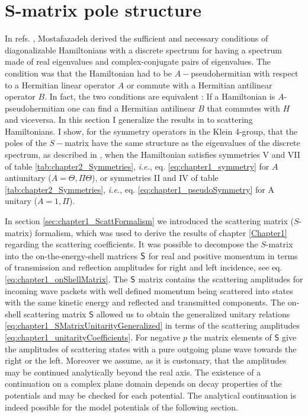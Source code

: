 \section{S-matrix pole structure}
\label{sec:chapter2_SPoles}
%
In refs. \cite{Mostafazadeh2002,Mostafazadeh2002a,Mostafazadeh2002b}, Mostafazadeh derived the sufficient and necessary conditions of diagonalizable Hamiltonians with a discrete spectrum for having a spectrum made of real eigenvalues and complex-conjugate pairs of eigenvalues. The condition was that the Hamiltonian had to be $A-$pseudohermitian with respect to a Hermitian linear operator $A$ or commute with a Hermitian antilinear operator $B$. In fact, the two conditions are equivalent \cite{Mostafazadeh2002b}: If a Hamiltonian is $A$-pseudohermitian one can find a Hermitian antilinear $B$ that commutes with $H$ and viceversa. In this section I generalize the results in \cite{Mostafazadeh2002,Mostafazadeh2002a,Mostafazadeh2002b} to scattering Hamiltonians. I show, for the symmetry operators in the Klein 4-group, that the poles of the $S-$matrix have the same structure as the eigenvalues of the discrete spectrum, as described in \cite{Mostafazadeh2002,Mostafazadeh2002a,Mostafazadeh2002b}, when the Hamiltonian satisfies symmetries V and VII of table \ref{tab:chapter2_Symmetries}, \textit{i.e.}, eq. \eqref{eq:chapter1_symmetry} for $A$ antiunitary ($A = \Theta,\Pi\Theta$), or symmetries II and IV of table \ref{tab:chapter2_Symmetries}, \textit{i.e.}, eq. \eqref{eq:chapter1_pseudoSymmetry} for A unitary ($A = 1,\Pi$).


In section \ref{sec:chapter1_ScattFormalism} we introduced the scattering matrix ($S$-matrix) formalism, which was used to derive the results of chapter \ref{Chapter1} regarding the scattering coefficients. It was possible to decompose the $S$-matrix into the on-the-energy-shell matrices $\sf{S}$ for real and positive momentum in terms of transmission and reflection amplitudes for right
and left incidence, see eq. \eqref{eq:chapter1_onShellMatrix}. The $\sf{S}$ matrix contains the scattering amplitudes for incoming wave packets with well defined momentum being scattered into states with the same kinetic energy and reflected and transmitted components. The on-shell scattering matrix $\mathsf{S}$ allowed us to obtain the generalized unitary relations \eqref{eq:chapter1_SMatrixUnitarityGeneralized} in terms of the scattering amplitudes \eqref{eq:chapter1_unitarityCoefficients}. For negative $p$ the matrix elements of $\mathsf{S}$ give the amplitudes of scattering states with a pure outgoing plane wave towards the right or the left. Moreover we assume, as it is customary, that the amplitudes may be continued analytically beyond the real axis. The existence of a continuation on a complex plane domain depends on decay properties of the potentials and may
be checked for each potential.
The analytical continuation is indeed possible for the model potentials of the following section.

